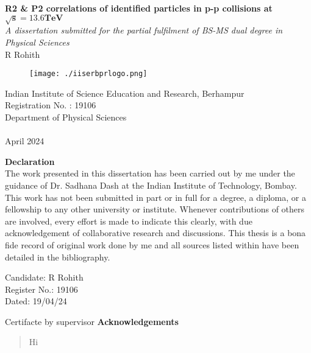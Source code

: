 \documentclass[12pt,a4paper,twoside]{report}
\newcommand{\usersetfontsize}[2]{\fontsize{#1}{#2}\selectfont}
\begin{document}
\usersetfontsize{12pt}{18pt}
\begin{titlepage}
{
	\centering
	\vspace*{2in}
	\textbf{\fontsize{16pt}{24pt}\selectfont R2 \& P2 correlations of identified particles in p-p collisions at $\mathbf{\sqrt{s}=13.6 TeV}$}%
	\\\vspace*{0.25in}
	\textit{A dissertation submitted for the partial fulfilment of BS-MS dual degree in Physical Sciences}%
	\\\vspace*{0.5in}
	{R Rohith}%
	\\\vspace*{2.8in}
	\begin{figure}[H]
		\centering
		\texttt{[image: ./iiserbprlogo.png]}
	\end{figure}
	{\usersetfontsize{14}{21}Indian Institute of Science Education and Research, Berhampur\\Registration No. : 19106\\Department of Physical Sciences\\}~\\
	{April 2024}\\
}	
\end{titlepage}
\vspace*{1in}
{\centering\Large \textbf{Declaration}\\}
\vspace*{0.5in}
The work presented in this dissertation has been carried out by me under the guidance of Dr. Sadhana Dash at the Indian Institute of Technology, Bombay. This work has not been submitted in part or in full for a degree, a diploma, or a fellowship to any other university or institute. Whenever contributions of others are involved, every effort is made to indicate this clearly, with due acknowledgement of collaborative research and discussions. This thesis is a bona fide record of original work done by me and all sources listed within have been detailed in the bibliography.
\vspace*{2.5in}
\begin{flushright}
	Candidate: R Rohith\\
	Register No.: 19106~~~\\
	Dated: 19/04/24~~~~~~~~~~
\end{flushright}
\newpage
Certifacte by supervisor
\newpage
\vspace*{1in}
{\centering\Large \textbf{Acknowledgements}\\}
\newpage
\begin{abstract}
	\thispagestyle{plain}
	\setcounter{page}{4}
	Hi
\end{abstract}
\newpage
\tableofcontents
\newpage
\listoffigures
\newpage
\listoftables
\newpage
{}
\pagestyle{headings}
\end{document}
